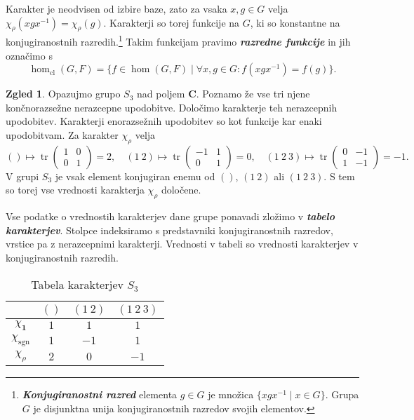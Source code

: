 \documentclass[11pt]{book}
\def\CC{\mathbf{C}}
\def\11{\mathbf{1}}
\DeclareMathOperator\sgn{sgn}
\DeclareMathOperator\tr{tr}
\DeclareMathOperator\cl{cl}
\def\definicija{\color{rdeca}\bf\em}
\theoremstyle{definition}
\theoremstyle{zgled}
\newtheorem*{zgled}{Zgled}
\theoremstyle{odprtproblem}
\theoremstyle{domacanaloga}
\theoremstyle{izrek}
\begin{document}
Karakter je neodvisen od izbire baze, zato za vsaka $x, g \in G$ velja $\chi_{\rho}(x g x^{-1}) = \chi_{\rho}(g)$. Karakterji so torej funkcije na $G$, ki so konstantne na konjugiranostnih razredih.\footnote{{\definicija Konjugiranostni razred} elementa $g \in G$ je množica $\{ x g x^{-1} \mid x \in G \}$. Grupa $G$ je disjunktna unija konjugiranostnih razredov svojih elementov.} Takim funkcijam pravimo {\definicija razredne funkcije} in jih označimo s
\[
    \hom_{\cl}(G,F) = \{ f \in \hom(G,F) \mid \forall x, g \in G \colon f(x g x^{-1}) = f(g) \}.
\]

\begin{zgled}
Opazujmo grupo $S_3$ nad poljem $\CC$. Poznamo že vse tri njene končnorazsežne nerazcepne upodobitve. Določimo karakterje teh nerazcepnih upodobitev. Karakterji enorazsežnih upodobitev so kot funkcije kar enaki upodobitvam. Za karakter $\chi_{\rho}$ velja
\[
    () \mapsto \tr \begin{pmatrix}
        1 & 0 \\ 0 & 1
    \end{pmatrix} = 2, \quad
    (1 \ 2) \mapsto \tr \begin{pmatrix}
        -1 & 1 \\ 0 & 1
    \end{pmatrix} = 0, \quad
    (1 \ 2 \ 3) \mapsto \tr \begin{pmatrix}
        0 & -1 \\ 1 & -1
    \end{pmatrix} = -1.
\]
V grupi $S_3$ je vsak element konjugiran enemu od $()$, $(1 \ 2)$ ali $(1 \ 2 \ 3)$. S tem so torej vse vrednosti karakterja $\chi_{\rho}$ določene.

Vse podatke o vrednostih karakterjev dane grupe ponavadi zložimo v {\definicija tabelo karakterjev}. Stolpce indeksiramo s predstavniki konjugiranostnih razredov, vrstice pa z nerazcepnimi karakterji. Vrednosti v tabeli so vrednosti karakterjev v konjugiranostnih razredih.

\begin{table}[h!]
     \centering
\begin{tabular}{c|ccc}
     & $()$ & $(1 \ 2)$ & $(1 \ 2 \ 3)$ \\ \hline
     $\chi_{\11}$ & $1$ & $1$ & $1$ \\
     $\chi_{\sgn}$ & $1$ & $-1$ & $1$ \\
     $\chi_{\rho}$ & $2$ & $0$ & $-1$ \\
\end{tabular}
\caption{Tabela karakterjev $S_3$}
\end{table}
\end{zgled}
\end{document}
